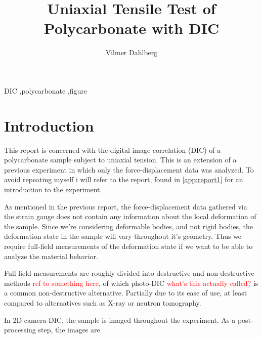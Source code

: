 \documentclass[5p,a4paper]{elsarticle}
\newcommand{\reporttitle}{Uniaxial Tensile Test of Polycarbonate with DIC}
\newcommand{\course}{Modern Experimental Mechanics}
\newcommand{\studentname}{Vilmer Dahlberg}
\newcommand{\institution}{Department of Construction Sciences,  Lund University}
\begin{document}
	
	\begin{frontmatter}
	
		\title{\reporttitle}
		\author{\studentname}
		\address{\course\\\institution}
		
		\begin{abstract}
			
		\end{abstract}
		
		\begin{keyword}
			DIC \sep polycarbonate \sep figure
		\end{keyword}
	
	\end{frontmatter}
	
	\section{Introduction}
	This report is concerned with the digital image correlation (DIC) of a polycarbonate sample subject to uniaxial tension. This is an extension of a previous experiment in which only the force-displacement data was analyzed. To avoid repeating myself i will refer to the report, found in \ref{app:report1} for an introduction to the experiment.
	
	
	As mentioned in the previous report, the force-displacement data gathered via the strain gauge does not contain any information about the local deformation of the sample. Since we're considering deformable bodies, and not rigid bodies, the deformation state in the sample will vary throughout it's geometry. Thus we require full-field measurements of the deformation state if we want to be able to analyze the material behavior.
	
	Full-field measurements are roughly divided into destructive and non-destructive methods \textcolor{red}{ref to something here}, of which photo-DIC \textcolor{red}{what's this actually called?} is a common non-destructive alternative. Partially due to its ease of use, at least compared to alternatives such as X-ray or neutron tomography. 
	
	
	
	In 2D camera-DIC, the sample is imaged throughout the experiment. As a post-processing step, the images are 
	
\end{document}
